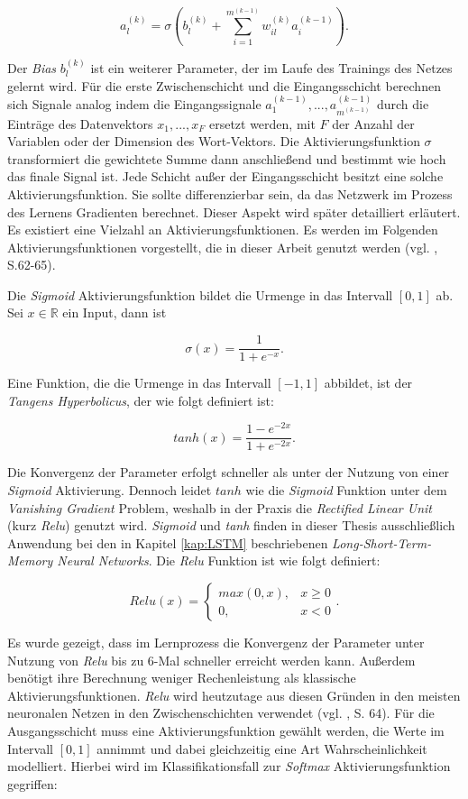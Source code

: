 \documentclass[a4paper,11pt]{article}
\begin{document}
\[ a_{l}^{(k)} = \sigma (b_l^{(k)} + \sum_{i=1}^{m^{(k-1)}} w_{il}^{(k)} a_{i}^{(k-1)}).\]

Der \textit{Bias} $b_l^{(k)}$ ist ein weiterer Parameter, der im Laufe des Trainings des Netzes gelernt wird.
Für die erste Zwischenschicht und die Eingangsschicht berechnen sich Signale analog indem die Eingangssignale $a_{1}^{(k-1)},..., a_{m^{(k-1)}}^{(k-1)}$ durch die Einträge des Datenvektors $x_1, ..., x_F$ ersetzt werden, mit $F$ der Anzahl der Variablen oder der Dimension des Wort-Vektors. Die Aktivierungsfunktion $\sigma$ transformiert die gewichtete Summe dann anschließend und bestimmt wie hoch das finale Signal ist. Jede Schicht außer der Eingangsschicht besitzt eine solche Aktivierungsfunktion. Sie sollte differenzierbar sein, da das Netzwerk im Prozess des Lernens Gradienten berechnet. Dieser Aspekt wird später detailliert erläutert. Es existiert eine Vielzahl an Aktivierungsfunktionen. Es werden im Folgenden Aktivierungsfunktionen vorgestellt, die in dieser Arbeit genutzt werden (vgl. \cite{deepEssentials}, S.62-65). 

Die \textit{Sigmoid} Aktivierungsfunktion bildet die Urmenge in das Intervall $\left[0, 1\right]$ ab. Sei $x \in \mathbb{R}$ ein Input, dann ist 

\[\sigma(x) =  \frac{1}{1+ e^{-x}}.\]

Eine Funktion, die die Urmenge in das Intervall $\left[-1, 1\right]$ abbildet, ist der \textit{Tangens Hyperbolicus}, der wie folgt definiert ist:

\[tanh(x) =  \frac{1- e^{-2x}}{1+ e^{-2x}}.\]


Die Konvergenz der Parameter erfolgt schneller als unter der Nutzung von einer \textit{Sigmoid} Aktivierung. Dennoch leidet $tanh$ wie die \textit{Sigmoid} Funktion unter dem \textit{Vanishing Gradient} Problem, weshalb in der Praxis die \textit{Rectified Linear Unit} (kurz \textit{Relu}) genutzt wird. \textit{Sigmoid} und \textit{tanh} finden in dieser Thesis ausschließlich Anwendung bei den in Kapitel \ref{kap:LSTM} beschriebenen \textit{Long-Short-Term-Memory Neural Networks}. Die \textit{Relu} Funktion ist wie folgt definiert:

\[Relu(x) = 
\begin{cases}
max(0,x), & x \geq 0 \\
0, & x <0
\end{cases}{}
.\]

Es wurde gezeigt, dass im Lernprozess die Konvergenz der Parameter unter Nutzung von \textit{Relu} bis zu 6-Mal schneller erreicht werden kann. Außerdem benötigt ihre Berechnung weniger Rechenleistung als klassische Aktivierungsfunktionen. \textit{Relu} wird heutzutage aus diesen Gründen in den meisten neuronalen Netzen in den Zwischenschichten verwendet (vgl. \cite{deepEssentials}, S. 64). Für die Ausgangsschicht muss eine Aktivierungsfunktion gewählt werden, die Werte im Intervall $\left[0, 1\right]$ annimmt und dabei gleichzeitig eine Art Wahrscheinlichkeit modelliert. Hierbei wird im Klassifikationsfall zur \textit{Softmax} Aktivierungsfunktion gegriffen:
\end{document}

